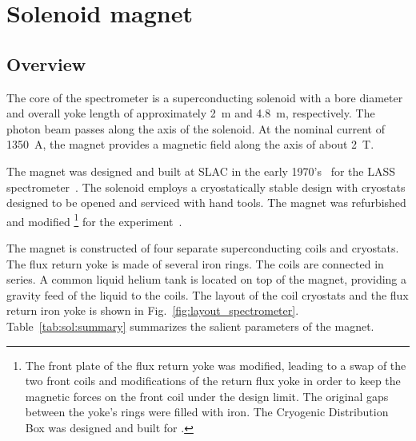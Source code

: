 
\section[Solenoid Magnet]{Solenoid magnet 
  \label{sec:solenoid}
}

\subsection[Overview]{Overview \label{sec:sol:overview}
}

The core of the \gx{} spectrometer is a superconducting
solenoid with a bore diameter and overall yoke length of approximately 2~m and 4.8~m, respectively. The photon beam passes along the axis of
the solenoid.  At the nominal current of 1350~A, the magnet provides a magnetic field along the axis of about 2~T.

The magnet was designed and built at SLAC in the early
1970's~\cite{Alcorn-confer-1972} for the LASS
spectrometer~\cite{Aston:1987uc}. The solenoid employs a cryostatically
stable design with cryostats designed to be opened and
serviced with hand tools. The magnet was refurbished and modified%
\footnote{
  The front plate of the flux return yoke was modified, leading to a
  swap of the two front coils and modifications of the return flux
  yoke in order to keep the magnetic forces on the front coil under
  the design limit.  The original gaps between the yoke's rings were
  filled with iron. The Cryogenic Distribution Box was designed and
  built for \gx{}.
} 
for the \gx{} experiment~\cite{Ballard:2011tm, Ballard:2015wma}. 

The magnet is constructed of four separate superconducting coils and
cryo\-stats. The flux return yoke is made of several iron rings.  The
coils are connected in series. A common liquid helium tank is located
on top of the magnet, providing a gravity feed of the liquid to the
coils. The layout of the coil cryostats and the flux return iron
yoke is shown in Fig.~\ref{fig:layout_spectrometer}.
Table~\ref{tab:sol:summary} summarizes the salient parameters of the  magnet.

  

